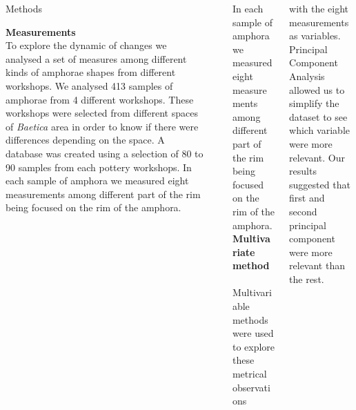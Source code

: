 \documentclass[final]{beamer}
\newlength{\sepwid}
\newlength{\onecolwid}
\newlength{\twocolwid}
\begin{document}
\begin{frame}[t]
\begin{columns}[t]
\begin{column}{\onecolwid}
\begin{block}{Methods}

{\textbf{Measurements}} \\

To explore the dynamic of changes we analysed a set of measures among different kinds of amphorae shapes from different workshops. We analysed 413 samples of amphorae from 4 different workshops. These workshops were selected from different spaces of \emph{Baetica} area in order to know if there were differences depending on the space. A database was created using a selection of 80 to 90 samples from each pottery workshops. In each sample of amphora we measured eight measurements among different part of the rim being focused on the rim of the amphora. 


\end{block}
\end{column} %



\begin{column}{\sepwid}\end{column} %

\begin{column}{\twocolwid} %


\begin{block}{}

\begin{columns}

\begin{column}{0.48\textwidth}
\justify
In each sample of amphora we measured eight measurements among different part of the rim being focused on the rim of the amphora.
\\
{\textbf{Multivariate method}} \\
\\
\justify
Multivariable methods were used to explore these metrical observations \cite{li}
\end{column}

\begin{column}{0.48\textwidth}
\justify
with the eight measurements as variables.\\ 
Principal Component Analysis allowed us to simplify the dataset to see which variable were more relevant. 
Our results suggested that first and second principal component were more relevant than the rest. 
\end{column}


\end{columns}
\end{block}
\end{column}
\end{columns}
\end{frame}
\end{document}
